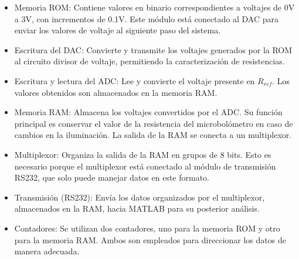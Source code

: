 \begin{itemize}
    \item Memoria ROM: Contiene valores en binario correspondientes a voltajes de 0V a 3V, con incrementos de 0.1V. Este módulo está conectado al DAC para enviar los valores de voltaje al siguiente paso del sistema.

    \item Escritura del DAC: Convierte y transmite los voltajes generados por la ROM al circuito divisor de voltaje, permitiendo la caracterización de resistencias.

    \item Escritura y lectura del ADC: Lee y convierte el voltaje presente en $R_{ref}$. Los valores obtenidos son almacenados en la memoria RAM.

    \item Memoria RAM: Almacena los voltajes convertidos por el ADC. Su función principal es conservar el valor de la resistencia del microbolómetro en caso de cambios en la iluminación. La salida de la RAM se conecta a un multiplexor.

    \item Multiplexor: Organiza la salida de la RAM en grupos de 8 bits. Esto es necesario porque el multiplexor está conectado al módulo de transmisión RS232, que solo puede manejar datos en este formato.

    \item Transmisión (RS232): Envía los datos organizados por el multiplexor, almacenados en la RAM, hacia MATLAB para su posterior análisis.

    \item Contadores: Se utilizan dos contadores, uno para la memoria ROM y otro para la memoria RAM. Ambos son empleados para direccionar los datos de manera adecuada.


\end{itemize}
